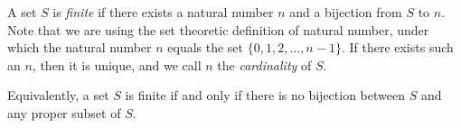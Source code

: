 \documentclass{article}
\begin{document}
A set $S$ is \emph{finite} if there exists a natural number $n$ and a bijection from $S$ to $n$. Note that we are using the set theoretic definition of natural number, under which the natural number $n$ equals the set $\{0,1,2,\ldots,n-1\}$.  If there exists such an $n$, then it is unique, and we call $n$ the \emph{cardinality} of $S$.

Equivalently, a set $S$ is finite if and only if there is no bijection between $S$ and any proper subset of $S$.
\end{document}
